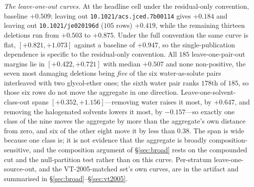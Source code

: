 \emph{The leave-one-out curves.} At the headline cell under the residual-only convention, baseline
$+0.509$: leaving out \texttt{10.1021/acs.jced.7b00114} gives $+0.184$ and leaving out
\texttt{10.1021/je020196d} ($105$ rows) $+0.419$, while the remaining thirteen deletions run from
$+0.503$ to $+0.875$. Under the full convention the same curve is flat, $[+0.821,+1.073]$ against a
baseline of $+0.947$, so the single-publication dependence is specific to the residual-only
convention. All $185$ leave-one-pair-out margins lie in $[+0.422,+0.721]$ with median $+0.507$ and
none non-positive, the seven most damaging deletions being \emph{five} of the six water-as-solute
pairs interleaved with two glycol-ether ones; the sixth water pair ranks $178$th of $185$, so those
six rows do not move the aggregate in one direction. Leave-one-solvent-class-out spans
$[+0.352,+1.156]$---removing water raises it most, by $+0.647$, and removing the halogenated
solvents lowers it most, by $-0.157$---so exactly one class of the nine moves the aggregate by more
than the aggregate's own distance from zero, and six of the other eight move it by less than $0.38$.
The span is wide because one class is; it is not evidence that the aggregate is broadly
composition-sensitive, and the composition argument of \S\ref{sec:broad} rests on the
compounded cut and the null-partition test rather than on this curve. Per-stratum
leave-one-source-out, and the VT-2005-matched set's own curves, are in the artifact and summarised in
\S\ref{sec:broad}--\S\ref{sec:vt2005}.

